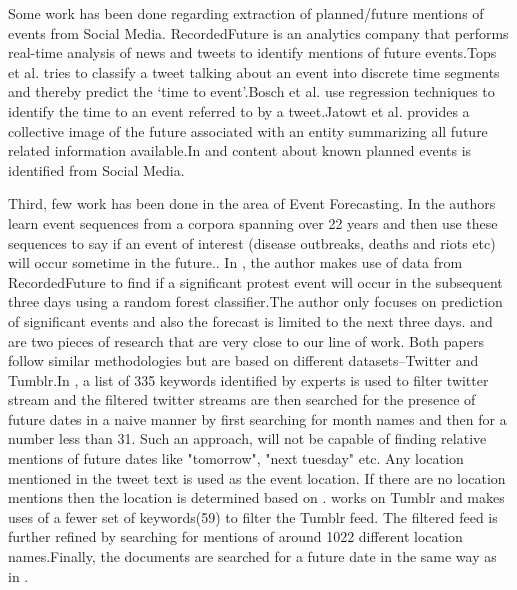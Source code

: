 Some work has been done regarding extraction of planned/future mentions of events from Social Media. RecordedFuture\cite{recordedFuture}  is an analytics company that performs real-time analysis of news and tweets to identify mentions of future events.Tops et al.\cite{tops2013predicting} tries to classify a tweet talking about an event into discrete time segments and thereby predict the `time to event'.Bosch et al.\cite{bosch2013estm} use regression techniques to identify the time to an event referred to by a tweet.Jatowt et al. \cite{Jatowt:2011:ECE} provides a collective image of the future associated with an entity summarizing all future related information available.In \cite{Becker:2012:ICP} and \cite{Becker_automaticidentification} content about known planned events is identified from Social Media.

Third, few work has been done in the area of Event Forecasting. In \cite{Radinsky:2013:MWP} the authors learn event sequences from a corpora spanning over 22 years and then use these sequences to say if an event of interest (disease outbreaks, deaths and riots etc) will occur sometime in the future.\iffalse They only predict if an event of interest will happen in the future given the sequence of events seen but do not predict when/where(city level resolution) that event will happen \fi. In \cite{nathankallus}, the author makes use of data from RecordedFuture\cite{recordedFuture} to find if a  significant protest event will occur in the subsequent three days using a random forest classifier.The author only focuses on prediction of significant events and also the forecast is limited to the next three days.\cite{compton2013detecting} and \cite{xu2014civil} are two pieces of research  that are very close to our line of work. Both papers follow similar methodologies but are based on different datasets--Twitter and Tumblr.In \cite{compton2013detecting}, a list of 335 keywords identified by experts is used to filter twitter stream and the filtered twitter streams are then searched for the presence of future dates in a naive manner by first searching for month names and then for a number less than 31. Such an approach, will not be capable of finding relative mentions of future dates like "tomorrow", "next tuesday" etc. Any location mentioned in the tweet text is used as the event location. If there are no location mentions then the location is determined based on \cite{hrlgeocoder}.\cite{xu2014civil} works on Tumblr and makes uses of a fewer set of keywords(59) to filter the Tumblr feed. The filtered feed is further refined by searching for mentions of around 1022 different location names.Finally, the documents are searched for a future date in the same way as in \cite{compton2013detecting}.

